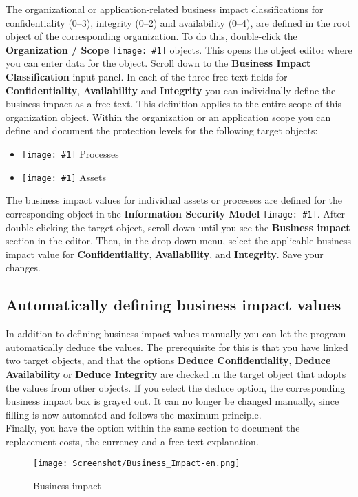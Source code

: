 \documentclass[a4paper,10pt]{book}
\newcommand{\icon}[1]{\texttt{[image: \#1]}}
\begin{document}
The organizational or application-related business impact classifications for
confidentiality (0--3), integrity (0--2) and availability (0--4), are defined in
the root object of the corresponding organization. To do this, double-click the
\textbf{Organization / Scope} \icon{Icon/GS_Modell.png}
objects. This opens the object editor where you can enter data for the object.
Scroll down to the \textbf{Business Impact Classification} input panel. In each
of the three free text fields for \textbf{Confidentiality},
\textbf{Availability} and \textbf{Integrity} you can individually define the
business impact as a free text. This definition applies to the entire scope of
this organization object. Within the organization or an application scope you
can define and document the protection levels for the following target objects:

\begin{itemize}
\item \icon{Icon/Prozesse.png} Processes
\item \icon{Icon/Asset.png} Assets
\end{itemize}

The business impact values for individual assets or processes are
defined for the corresponding object in the \textbf{Information Security Model}
\icon{Icon/Informationssicherheitsmodell.png}. After
double-clicking the target object, scroll down until you see the
\textbf{Business impact} section in the editor. Then, in the drop-down menu,
select the applicable business impact value for \textbf{Confidentiality},
\textbf{Availability}, and \textbf{Integrity}. Save your changes.


\subsection{Automatically defining business impact values} \label{Automatically defining business impact values}
In addition to defining business impact values manually you can let the program automatically deduce the values.
The prerequisite for this is that you have linked two target objects, and that the options
\textbf{Deduce Confidentiality}, \textbf{Deduce Availability} or \textbf{Deduce Integrity}
are checked in the target object that adopts the values from other objects. If you select the deduce
option, the corresponding business impact box is grayed out. It can no longer be changed manually, since
filling is now automated and follows the maximum principle.
\newline\\
Finally, you have the option within the same section to document the replacement costs, the currency and a
free text explanation.
\newline
\begin{figure}[htb!]
  \centering
  \texttt{[image: Screenshot/Business\_Impact-en.png]}
  \caption{\label{Business impact} Business impact}
\end{figure}
\newline
\end{document}
